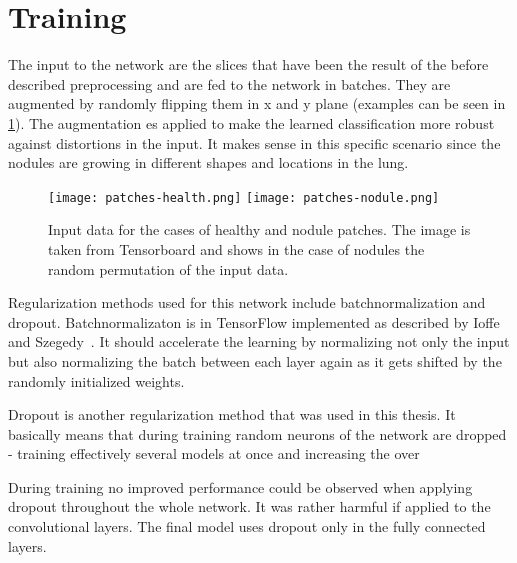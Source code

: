 \documentclass[main.tex]{subfiles}
\begin{document}
\section{Training}
The input to the network are the slices that have been the result of the before described preprocessing and are fed to the network in batches. They are augmented by randomly flipping them in x and y plane (examples can be seen in \ref{fig:input}). The augmentation es applied to make the learned classification more robust against distortions in the input. It makes sense in this specific scenario since the nodules are growing in different shapes and locations in the lung.

\begin{figure}
\begin{center}
\texttt{[image: patches-health.png]}
\texttt{[image: patches-nodule.png]}
\end{center}
\caption{Input data for the cases of healthy and nodule patches. The image is taken from Tensorboard and shows in the case of nodules the random permutation of the input data.}
\label{fig:input}
\end{figure}

Regularization methods used for this network include batchnormalization and dropout. Batchnormalizaton is in TensorFlow implemented as described by Ioffe and Szegedy~\cite{ioffe2015batch}. It should accelerate the learning by normalizing not only the input but also normalizing the batch between each layer again as it gets shifted by the randomly initialized weights. 

Dropout is another regularization method that was used in this thesis. It basically means that during training random neurons of the network are dropped - training effectively several models at once \cite{srivastava2014dropout} and increasing the over


During training no improved performance could be observed when applying dropout throughout the whole network. It was rather harmful if applied to the convolutional layers. The final model uses dropout only in the fully connected  layers.
\end{document}
